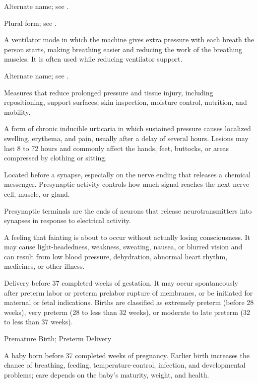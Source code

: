  Alternate name; see .

 Plural form; see .

 A ventilator mode in which the machine gives extra pressure with each breath the person starts, making breathing easier and reducing the work of the breathing muscles. It is often used while reducing ventilator support.

 Alternate name; see .

 Measures that reduce prolonged pressure and tissue injury, including repositioning, support
surfaces, skin inspection, moisture control, nutrition, and mobility.

 A form of chronic inducible urticaria in which sustained pressure causes localized
swelling, erythema, and pain, usually after a delay of several hours. Lesions may last 8
to 72 hours and commonly affect the hands, feet, buttocks, or areas compressed by
clothing or sitting.

 Located before a synapse, especially on the nerve ending that releases a chemical messenger. Presynaptic activity controls how much signal reaches the next nerve cell, muscle, or gland.

 Presynaptic terminals are the ends of neurons that release neurotransmitters into synapses in response to electrical activity.

 A feeling that fainting is about to occur without actually losing consciousness. It may cause light-headedness, weakness, sweating, nausea, or blurred vision and can result from low blood pressure, dehydration, abnormal heart rhythm, medicines, or other illness.

 Delivery before 37 completed weeks of gestation. It may occur
spontaneously after preterm labor or preterm prelabor rupture of membranes, or be
initiated for maternal or fetal indications. Births are classified as extremely preterm
(before 28 weeks), very preterm (28 to less than 32 weeks), or moderate to late preterm
(32 to less than 37 weeks).

\synonyms
Premature Birth; Preterm Delivery

 A baby born before 37 completed weeks of pregnancy. Earlier birth increases the chance of breathing, feeding, temperature-control, infection, and developmental problems; care depends on the baby’s maturity, weight, and health.

